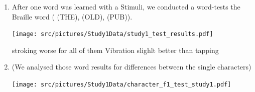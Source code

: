 \begin{enumerate}
    \item After one word was learned with a Stimuli, we conducted a word-tests the Braille word ( (THE),  (OLD),  (PUB)).

        \centering
        \texttt{[image: src/pictures/Study1Data/study1\_test\_results.pdf]}

    
\begin{table}[ht]
\caption{Results of the Kruskal-Wallis significance tests for the wordtests \enquote{THE}, \enquote{OLD}, and \enquote{PUB} with a $\eta^2$ Effect Size.}
\label{table:significance_results_test_firstStudy}
\end{table}
stroking worse for all of them
Vibration slighlt better than tapping


    \item (We analysed those word results for differences between the single characters)
        
        \centering
        \texttt{[image: src/pictures/Study1Data/character\_f1\_test\_study1.pdf]}



\end{enumerate}
